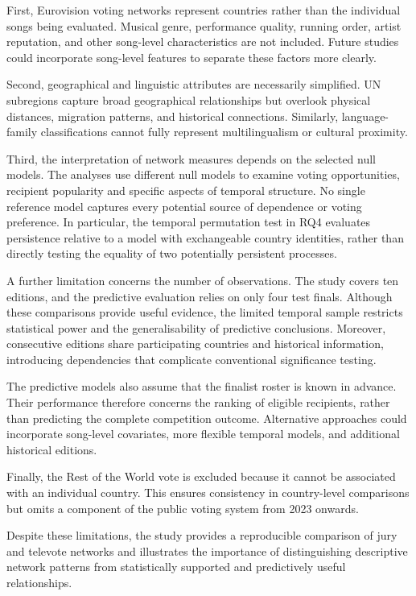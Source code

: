 \documentclass[12pt,a4paper]{article}
\begin{document}
First, Eurovision voting networks represent
countries rather than the individual songs
being evaluated. Musical genre, performance
quality, running order, artist reputation,
and other song-level characteristics are
not included. Future studies could incorporate song-level
features to separate these factors more clearly.

Second, geographical and linguistic attributes
are necessarily simplified. UN subregions
capture broad geographical relationships
but overlook physical distances, migration
patterns, and historical connections.
Similarly, language-family classifications
cannot fully represent multilingualism
or cultural proximity.

Third, the interpretation of network measures
depends on the selected null models.
The analyses use different null models to examine
voting opportunities, recipient popularity and
specific aspects of temporal structure. No single
reference model captures every potential source
of dependence or voting preference. In particular,
the temporal permutation test in RQ4
evaluates persistence relative to a model
with exchangeable country identities,
rather than directly testing the equality
of two potentially persistent processes.

A further limitation concerns the number of
observations. The study covers ten editions,
and the predictive evaluation relies on
only four test finals. Although these
comparisons provide useful evidence,
the limited temporal sample restricts
statistical power and the generalisability
of predictive conclusions. Moreover,
consecutive editions share participating
countries and historical information,
introducing dependencies that complicate
conventional significance testing.

The predictive models also assume that
the finalist roster is known in advance.
Their performance therefore concerns the
ranking of eligible recipients, rather
than predicting the complete competition
outcome. Alternative approaches could
incorporate song-level covariates,
more flexible temporal models, and
additional historical editions.

Finally, the Rest of the World vote is
excluded because it cannot be associated
with an individual country. This ensures
consistency in country-level comparisons
but omits a component of the public
voting system from 2023 onwards.

Despite these limitations, the study
provides a reproducible comparison of
jury and televote networks and illustrates
the importance of distinguishing
descriptive network patterns from
statistically supported and
predictively useful relationships.
\newpage
\end{document}
